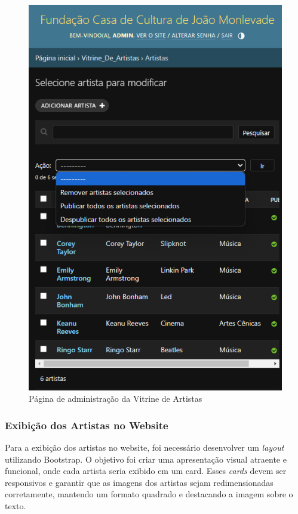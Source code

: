 \begin{figure}[htb]
	\caption{\label{fig_adm_vitrine}Página de administração da Vitrine de Artistas}
	\begin{center}
	    \includegraphics[scale=0.3]{./img/admin_artista.png}
	\end{center}
\end{figure}

\subsubsection{Exibição dos Artistas no Website}

Para a exibição dos artistas no website, foi necessário desenvolver um \textit{layout} utilizando Bootstrap. O objetivo foi criar uma apresentação visual atraente e funcional, onde cada artista seria exibido em um card. Esses \textit{cards} devem ser responsivos e garantir que as imagens dos artistas sejam redimensionadas corretamente, mantendo um formato quadrado e destacando a imagem sobre o texto.


